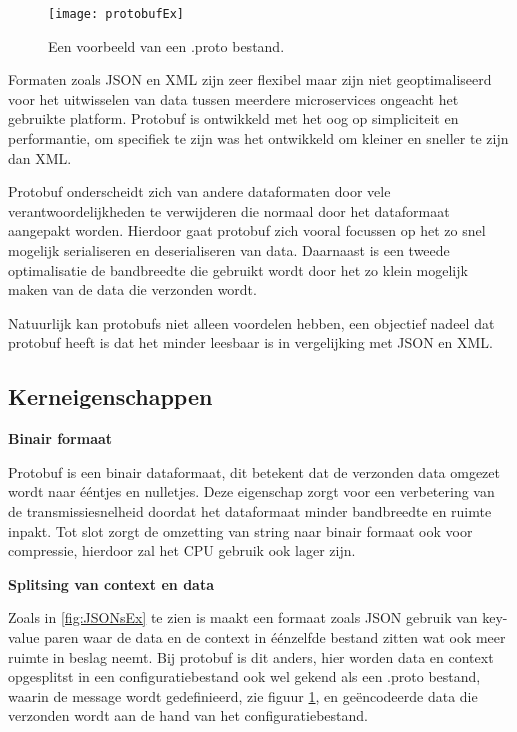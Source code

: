 \begin{figure}[H]
    \centering
    \texttt{[image: protobufEx]}
    \caption[Protocol Buffer .proto bestand]{Een voorbeeld van een .proto bestand.  \autocite{Kurian2020}}
    \label{fig:protobufEx}
\end{figure}

Formaten zoals JSON en XML zijn zeer flexibel maar zijn niet geoptimaliseerd voor het uitwisselen van data tussen meerdere microservices \autocite{Fowler2014} ongeacht het gebruikte platform. Protobuf is ontwikkeld met het oog op simpliciteit en performantie, om specifiek te zijn was het ontwikkeld om kleiner en sneller te zijn dan XML.

Protobuf onderscheidt zich van andere dataformaten door vele verantwoordelijkheden te verwijderen die normaal door het dataformaat aangepakt worden. Hierdoor gaat protobuf zich vooral focussen op het zo snel mogelijk serialiseren en deserialiseren van data. Daarnaast is een tweede optimalisatie de bandbreedte die gebruikt wordt door het zo klein mogelijk maken van de data die verzonden wordt.

Natuurlijk kan protobufs niet alleen voordelen hebben, een objectief nadeel dat protobuf heeft is dat het minder leesbaar is in vergelijking met JSON en XML.


\subsection{Kerneigenschappen}
\label{subsec:Kerneigenschappen}

\textbf{Binair formaat}

Protobuf is een binair dataformaat, dit betekent dat de verzonden data omgezet wordt naar ééntjes en nulletjes. Deze eigenschap zorgt voor een verbetering van de transmissiesnelheid doordat het dataformaat minder bandbreedte en ruimte inpakt. Tot slot zorgt de omzetting van string naar binair formaat ook voor compressie, hierdoor zal het CPU gebruik ook lager zijn.

\textbf{Splitsing van context en data}

Zoals in \ref{fig:JSONsEx} te zien is maakt een formaat zoals JSON gebruik van key-value paren waar de data en de context in éénzelfde bestand zitten wat ook meer ruimte in beslag neemt. Bij protobuf is dit anders, hier worden data en context opgesplitst in een configuratiebestand ook wel gekend als een .proto bestand, waarin de message wordt gedefinieerd, zie figuur \ref{fig:protobufEx}, en geëncodeerde data die verzonden wordt aan de hand van het configuratiebestand.

